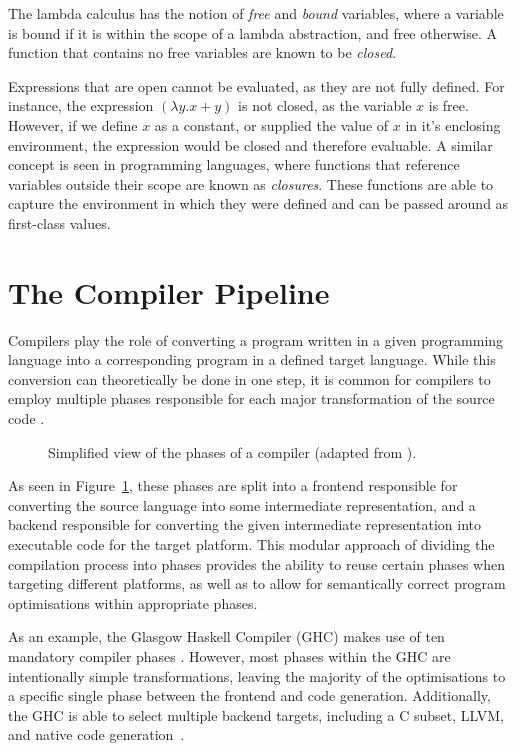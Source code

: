 The lambda calculus has the notion of \emph{free} and \emph{bound} variables, where a variable is
bound if it is within the scope of a lambda abstraction, and free otherwise. A function that
contains no free variables are known to be \emph{closed}.

Expressions that are open cannot be evaluated, as they are not fully defined. For instance, the
expression \((\lambda y. x + y)\) is not closed, as the variable \(x\) is free. However, if we
define \(x\) as a constant, or supplied the value of \(x\) in it's enclosing environment, the
expression would be closed and therefore evaluable. A similar concept is seen in programming
languages, where functions that reference variables outside their scope are known as
\emph{closures}. These functions are able to capture the environment in which they were defined and
can be passed around as first-class values.

\section{The Compiler Pipeline}

Compilers play the role of converting a program written in a given programming language into a
corresponding program in a defined target language. While this conversion can theoretically be done
in one step, it is common for compilers to employ multiple phases responsible for each major
transformation of the source code \autocite{grune2012modern}.

\begin{figure}
    \centering
    
    \caption{Simplified view of the phases of a compiler (adapted from \autocite{grune2012modern}).}
    \label{fig:compiler-pipeline}
\end{figure}

As seen in Figure~\ref{fig:compiler-pipeline}, these phases are split into a frontend responsible
for converting the source language into some intermediate representation, and a backend responsible
for converting the given intermediate representation into executable code for the target platform.
This modular approach of dividing the compilation process into phases provides the ability to reuse
certain phases when targeting different platforms, as well as to allow for semantically correct
program optimisations within appropriate phases.

As an example, the Glasgow Haskell Compiler (GHC) makes use of ten mandatory compiler phases
\autocite{ghccompiler}. However, most phases within the GHC are intentionally simple
transformations, leaving the majority of the optimisations to a specific single phase between the
frontend and code generation. Additionally, the GHC is able to select multiple backend targets,
including a C subset, LLVM, and native code generation~\autocite{jones1997transformation}.

